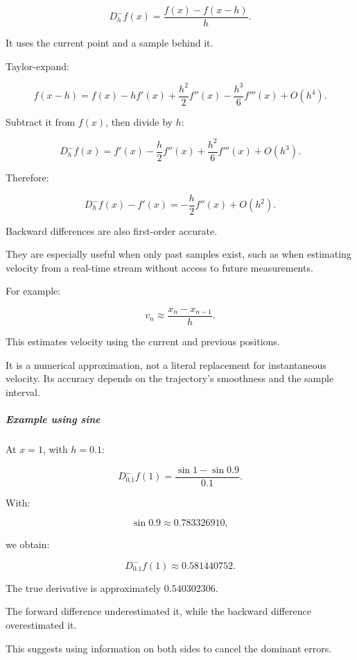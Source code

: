 \[
\boxed{ D_h^-f(x)= \frac{f(x)-f(x-h)}h }.
\]

It uses the current point and a sample behind it.

Taylor-expand:

\[
f(x-h) = f(x)-hf'(x)+ \frac{h^2}{2}f''(x)- \frac{h^3}{6}f'''(x)+O(h^4).
\]

Subtract it from \(f(x)\), then divide by \(h\):

\[
D_h^-f(x) = f'(x)- \frac h2f''(x)+ \frac{h^2}{6}f'''(x)+O(h^3).
\]

Therefore:

\[
\boxed{ D_h^-f(x)-f'(x) = -\frac h2f''(x)+O(h^2) }.
\]

Backward differences are also first-order accurate.

They are especially useful when only past samples exist, such as when estimating velocity from a real-time stream without access to future measurements.

For example:

\[
v_n\approx\frac{x_n-x_{n-1}}h.
\]

This estimates velocity using the current and previous positions.

It is a numerical approximation, not a literal replacement for instantaneous velocity. Its accuracy depends on the trajectory's smoothness and the sample interval.

\begin{allmightroleexample}

\subparagraph{Example using sine}\label{02-foundations-ii-ch025-example-using-sine}

\hypertarget{02-foundations-ii-ch025-example-using-sine}{}

At \(x=1\), with \(h=0.1\):

\end{allmightroleexample}

\[
D_{0.1}^-f(1) = \frac{\sin1-\sin0.9}{0.1}.
\]

With:

\[
\sin0.9\approx0.783326910,
\]

we obtain:

\[
\boxed{ D_{0.1}^-f(1)\approx0.581440752 }.
\]

The true derivative is approximately \(0.540302306\).

The forward difference underestimated it, while the backward difference overestimated it.

This suggests using information on both sides to cancel the dominant errors.

